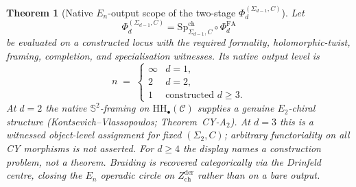 \documentclass[11pt]{article}
\theoremstyle{plain}
\newtheorem{theorem}{Theorem}[section]
\theoremstyle{definition}
\theoremstyle{remark}
\newcommand{\cC}{\mathcal{C}}
\newcommand{\bS}{\mathbb{S}}
\newcommand{\Etwo}{E_2}
\newcommand{\En}{E_n}
\newcommand{\HH}{\mathrm{HH}}
\newcommand{\SpCh}{\mathrm{Sp}^{\mathrm{ch}}}
\begin{document}
\begin{theorem}[Native $\En$-output scope of the two-stage $\Phi_d^{(\Sigma_{d-1},C)}$]
\label{thm:phi-native-en-scope}
Let
\[
 \Phi_d^{(\Sigma_{d-1},C)}
 =\SpCh_{\Sigma_{d-1},C}\circ\Phi^{\mathrm{FA}}_d
\]
be evaluated on a constructed locus with the required formality,
holomorphic-twist, framing, completion, and specialisation witnesses.
Its native output level is
\[
 n \;=\; \begin{cases} \infty & d = 1, \\ 2 & d = 2, \\
1 & \text{constructed } d \ge 3. \end{cases}
\]
At $d = 2$ the native $\bS^2$-framing on $\HH_\bullet(\cC)$
supplies a genuine $\Etwo$-chiral structure
(Kontsevich--Vlassopoulos; Theorem~\textup{CY-A$_2$}).
At $d = 3$ this is a witnessed object-level assignment for fixed
$(\Sigma_2,C)$; arbitrary functoriality on all CY morphisms is not
asserted.  For $d\geq4$ the display names a construction problem, not
a theorem.  Braiding is recovered categorically via the Drinfeld
centre, closing the $\En$ operadic circle on
$Z^{\mathrm{der}}_{\mathrm{ch}}$ rather than on a bare output.
\end{theorem}
\end{document}
